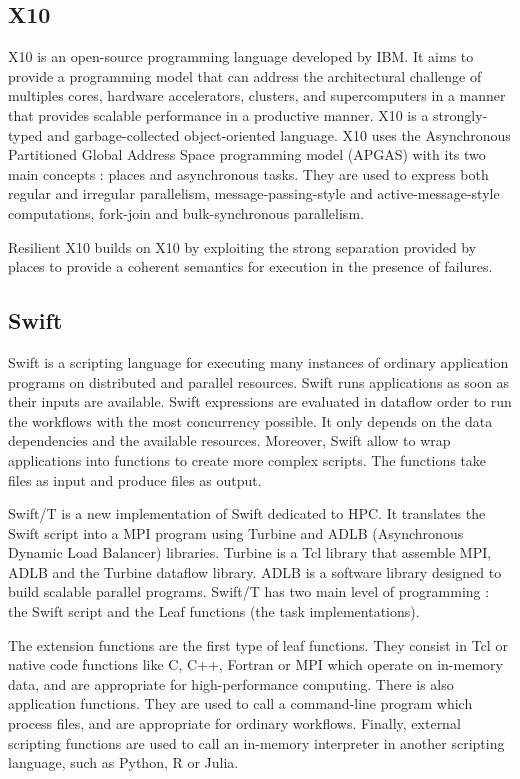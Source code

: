 \subsection{X10}
X10 \cite{CGSDK2005} is an open-source programming language developed by IBM.
It aims to provide a programming model that can address the architectural challenge of multiples cores, hardware accelerators, clusters, and supercomputers in a manner that provides scalable performance in a productive manner.
X10 is a strongly-typed and garbage-collected object-oriented language.
X10 uses the Asynchronous Partitioned Global Address Space programming model (APGAS) with its two main concepts :  places and asynchronous tasks.
They are used to express both regular and irregular parallelism, message-passing-style and active-message-style computations, fork-join and bulk-synchronous parallelism.

Resilient X10 \cite{HHMGT2016}  \cite{GHHIK2019} builds on X10 by exploiting the strong separation provided by places to provide a coherent semantics for execution in the presence of failures.


\subsection{Swift}
Swift \cite{ZHCFL2007} \cite{WHWCK2011} is a scripting language for executing many instances of ordinary application programs on distributed and parallel resources.
Swift runs applications as soon as their inputs are available.
Swift expressions are evaluated in dataflow order to run the workflows with the most concurrency possible.
It only depends on the data dependencies and the available resources.
Moreover, Swift allow to wrap applications into functions to create more complex scripts.
The functions take files as input and produce files as output.

Swift/T \cite{WAWKL2013} is a new implementation of Swift dedicated to HPC.
It translates the Swift script into a MPI program using Turbine \cite{WAMLK2012} and ADLB (Asynchronous Dynamic Load Balancer) \cite{LusPB2010} libraries.
Turbine is a Tcl library that assemble MPI, ADLB and the Turbine dataflow library.
ADLB is a software library designed to build scalable parallel programs.
Swift/T has two main level of programming : the Swift script and the Leaf functions (the task implementations).

The extension functions are the first type of leaf functions.
They consist in Tcl or native code functions like C, C++, Fortran or MPI which operate on in-memory data, and are appropriate for high-performance computing.
There is also application functions.
They are used to call a command-line program which process files, and are appropriate for ordinary workflows.
Finally, external scripting functions are used to call an in-memory interpreter in another scripting language, such as Python, R or Julia.

